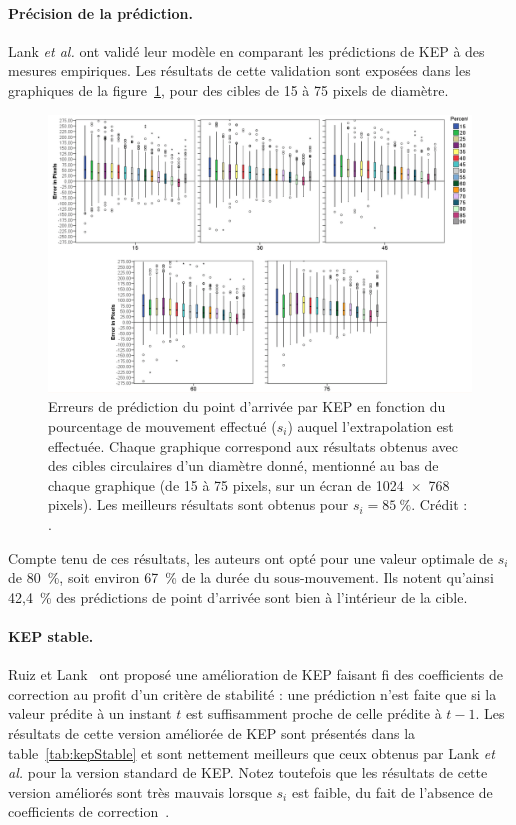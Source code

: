 	\paragraph{Précision de la prédiction.}
	Lank \emph{et al.} ont validé leur modèle en comparant les prédictions de KEP à des mesures empiriques. Les résultats de cette validation sont exposées dans les graphiques de la figure~\ref{fig:kepErrors}, pour des cibles de 15 à 75 pixels de diamètre.
	
	\begin{figure}[!htb]
		\centering
		\includegraphics[width=\textwidth]{figures/ch2/kepErrors}
		\caption[KEP -- erreurs de prédiction]{Erreurs de prédiction du point d'arrivée par KEP en fonction du pourcentage de mouvement effectué ($s_{i}$) auquel l'extrapolation est effectuée. Chaque graphique correspond aux résultats obtenus avec des cibles circulaires d'un diamètre donné, mentionné au bas de chaque graphique (de 15 à 75 pixels, sur un écran de 1024~$\times$~768 pixels). Les meilleurs résultats sont obtenus pour $s_{i} = 85~\%{}$. Crédit : \cite{lank2007endpoint}.}
		\label{fig:kepErrors}
	\end{figure}
	
	Compte tenu de ces résultats, les auteurs ont opté pour une valeur optimale de $s_{i}$ de 80~\%{}, soit environ 67~\%{} de la durée du sous-mouvement. Ils notent qu'ainsi 42,4~\%{} des prédictions de point d'arrivée sont bien à l'intérieur de la cible.
	
	\paragraph{KEP stable.}
	Ruiz et Lank~\cite{ruiz2009effects} ont proposé une amélioration de KEP faisant fi des coefficients de correction au profit d'un critère de stabilité : une prédiction n'est faite que si la valeur prédite à un instant $t$ est suffisamment proche de celle prédite à $t-1$. Les résultats de cette version améliorée de KEP sont présentés dans la table~\ref{tab:kepStable} et sont nettement meilleurs que ceux obtenus par Lank \emph{et al.} pour la version standard de KEP. Notez toutefois que les résultats de cette version améliorés sont très mauvais lorsque $s_{i}$ est faible, du fait de l'absence de coefficients de correction~\cite{ruiz2009effects}.
	
